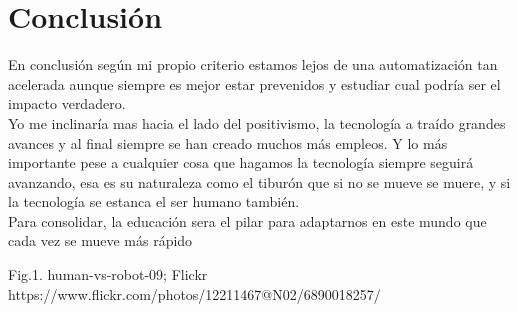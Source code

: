 \documentclass[journal]{IEEEtran}
\begin{document}
\section{Conclusión}
En conclusión según mi propio criterio estamos lejos de una automatización tan acelerada aunque siempre es mejor estar prevenidos y estudiar cual podría ser el impacto verdadero.\\ Yo me inclinaría mas hacia el lado del positivismo, la tecnología a traído grandes avances y al final siempre se han creado muchos más empleos. Y lo más importante pese a cualquier cosa que hagamos la tecnología siempre seguirá avanzando, esa es su naturaleza como el tiburón que si no se mueve se muere, y si la tecnología se estanca el ser humano también.\\Para consolidar, la educación sera el pilar para adaptarnos en este mundo que cada vez se mueve más rápido

\begin{thebibliography}{1}

Fig.1. human-vs-robot-09; Flickr\\https://www.flickr.com/photos/12211467@N02/6890018257/

\end{thebibliography}
\end{document}

